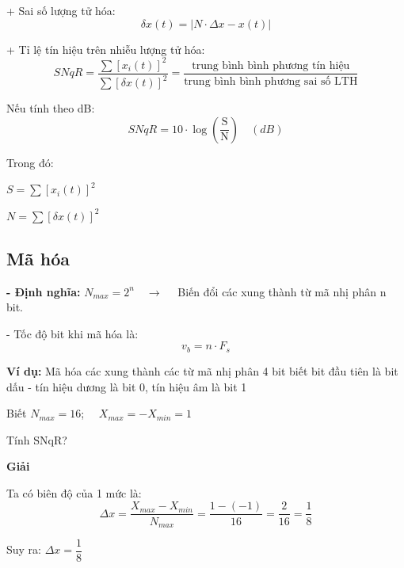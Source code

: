 \hspace*{0.5cm}+ Sai số lượng tử hóa:
\[
    \boxed{
        \delta x(t) = |N \cdot \Delta x - x(t)|
    }
\]

\hspace*{0.5cm}+ Tỉ lệ tín hiệu trên nhiễu lượng tử hóa:
\[
    \boxed{
        SNqR = \dfrac{\sum [x_i(t)]^2}{\sum [\delta x(t)]^2} = \dfrac{\text{trung bình bình phương tín hiệu}}{\text{trung bình bình phương sai số LTH}}
    }
\]

\hspace*{0.5cm}Nếu tính theo dB:
\[
    \boxed{
        SNqR = 10 \cdot \log \left(\dfrac{\text{S}}{\text{N}}\right)
    }
    \quad (dB)
\]

\hspace*{1cm}Trong đó:

\hspace*{3cm}$S = \sum [x_i(t)]^2$

\hspace*{3cm}$N = \sum [\delta x(t)]^2$

\subsection{Mã hóa}

\textbf{- Định nghĩa:} $\boxed{N_{max} = 2^n} \quad \rightarrow \quad$ Biến đổi các xung thành từ mã nhị phân n bit. 

- Tốc độ bit khi mã hóa là:
\[
    \boxed{
        v_b = n \cdot F_s
    }
\]

\vspace{1cm}

\noindent\textbf{Ví dụ:} Mã hóa các xung thành các từ mã nhị phân 4 bit biết bit đầu tiên là bit dấu - tín hiệu dương là bit 0, tín hiệu âm là bit 1

Biết $N_{max} = 16$; $\quad X_{max} = -X_{min} = 1$  

Tính SNqR?

\begin{center}
    
\end{center}

\begin{center}
    \textbf{Giải}
\end{center}

Ta có biên độ của 1 mức là:
\[
    \Delta x = \dfrac{X_{max} - X_{min}}{N_{max}} = \dfrac{1-(-1)}{16} = \dfrac{2}{16} = \dfrac{1}{8} 
\]

Suy ra: $\Delta x = \dfrac{1}{8}$

